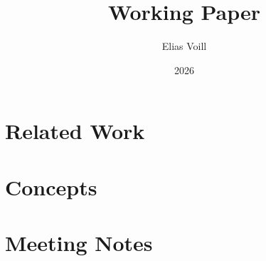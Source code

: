 \documentclass[a4paper, 11pt]{article}
\title{Working Paper}
\author{Elias Voill}
\date{2026}
\begin{document}
\maketitle

\section{Related Work}


\section{Concepts}





\printbibliography

\section{Meeting Notes}





\end{document}
